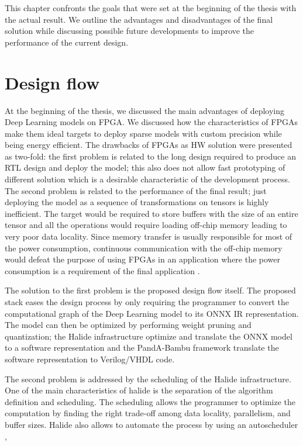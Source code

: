 \documentclass[../main.tex]{subfiles}
\begin{document}
This chapter confronts the goals that were set at the beginning of the thesis with the actual result.
We outline the advantages and disadvantages of the final solution while discussing possible future developments to improve the performance of the current design.

\newpage
\section{Design flow}
At the beginning of the thesis, we discussed the main advantages of deploying Deep Learning models on FPGA.
We discussed how the characteristics of FPGAs make them ideal targets to deploy sparse models with custom precision while being energy efficient.
The drawbacks of FPGAs as HW solution were presented as two-fold: the first problem is related to the long design required to produce an RTL design and deploy the model; this also does not allow fast prototyping of different solution which is a desirable characteristic of the development process.
The second problem is related to the performance of the final result; just deploying the model as a sequence of transformations on tensors is highly inefficient. The target would be required to store buffers with the size of an entire tensor and all the operations would require loading off-chip memory leading to very poor data locality.
Since memory transfer is usually responsible for most of the power consumption, continuous communication with the off-chip memory would defeat the purpose of using FPGAs in an application where the power consumption is a requirement of the final application \cite{DBLP:journals/corr/abs-1901-04988}.

The solution to the first problem is the proposed design flow itself.
The proposed stack eases the design process by only requiring the programmer to convert the computational graph of the Deep Learning model to its ONNX IR representation.
The model can then be optimized by performing weight pruning and quantization; the Halide infrastructure optimize and translate the ONNX model to a software representation and the PandA-Bambu framework translate the software representation to Verilog/VHDL code.

The second problem is addressed by the scheduling of the Halide infrastructure.
One of the main characteristics of halide is the separation of the algorithm definition and scheduling. 
The scheduling allows the programmer to optimize the computation by finding the right trade-off among data locality, parallelism, and buffer sizes.
Halide also allows to automate the process by using an autoscheduler \cite{halideAutoscheduler},
\end{document}
